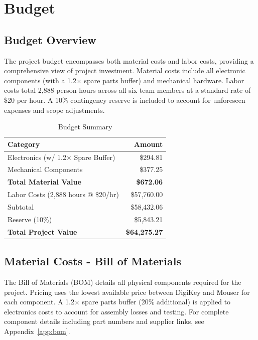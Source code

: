 
\section{Budget}\label{sec:budget}

\subsection{Budget Overview}

The project budget encompasses both material costs and labor costs, providing a comprehensive view of project investment. Material costs include all electronic components (with a 1.2$\times$ spare parts buffer) and mechanical hardware. Labor costs total 2,888 person-hours across all six team members at a standard rate of \$20 per hour. A 10\% contingency reserve is included to account for unforeseen expenses and scope adjustments.

\begin{table}[H]
\centering
\caption{Budget Summary}
\label{tab:budget_summary}
\begin{tabular}{@{}lr@{}}
\toprule
\textbf{Category} & \textbf{Amount} \\
\midrule
Electronics (w/ 1.2$\times$ Spare Buffer) & \$294.81 \\
Mechanical Components & \$377.25 \\
\midrule
\textbf{Total Material Value} & \textbf{\$672.06} \\
\midrule
Labor Costs (2,888 hours @ \$20/hr) & \$57,760.00 \\
\midrule
Subtotal & \$58,432.06 \\
Reserve (10\%) & \$5,843.21 \\
\midrule
\textbf{Total Project Value} & \textbf{\$64,275.27} \\
\bottomrule
\end{tabular}
\end{table}

\subsection{Material Costs - Bill of Materials}

The Bill of Materials (BOM) details all physical components required for the project. Pricing uses the lowest available price between DigiKey and Mouser for each component. A 1.2$\times$ spare parts buffer (20\% additional) is applied to electronics costs to account for assembly losses and testing. For complete component details including part numbers and supplier links, see Appendix~\ref{app:bom}.


